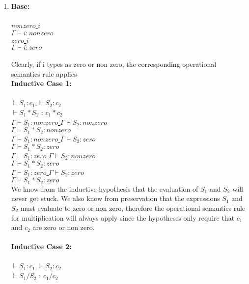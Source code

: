 \documentclass[11pt]{article}
\begin{document}
\begin{enumerate}
\begin{enumerate}
		
\item \textbf{Base:}\\
		\\
			\underline{$non zero$ $i$}\\
			$\Gamma\vdash i:non zero$\\
			
			\underline{$zero$ $i$}\\
			$\Gamma\vdash i:zero$\\
			\\
			
			Clearly, if i types as zero or non zero, the corresponding operational
semantics rule applies\\
			\textbf{Inductive Case 1:}\\
			\\
			\underline{$\vdash S_1:c_1$ \hspace{12} $\vdash S_2:c_2$}\\
			$\vdash S_1*S_2$ : $c_1*c_2$\\
			
			\underline{$\Gamma\vdash S_1:non zero$ \hspace{12} $\Gamma\vdash S_2:non zero$}\\
			$\Gamma\vdash S_1*S_2:non zero$\\
		
			\underline{$\Gamma\vdash S_1:non zero$ \hspace{12} $\Gamma\vdash S_2:zero$}\\
			$\Gamma\vdash S_1*S_2:zero$\\
		
			\underline{$\Gamma\vdash S_1:zero$ \hspace{12} $\Gamma\vdash S_2:non zero$}\\
			$\Gamma\vdash S_1*S_2:zero$\\
		
			\underline{$\Gamma\vdash S_1:zero$ \hspace{12} $\Gamma\vdash S_2:zero$}\\
			$\Gamma\vdash S_1*S_2:zero$\\
			
			We know from the inductive hypothesis that the evaluation of
$S_1$ and $S_2$ will never get stuck. We also know from
preservation that the expressions $S_1$ and $S_2$ must evaluate to
zero or non zero, therefore the operational
semantics rule for multiplication will always apply since the hypotheses
only require that $c_1$ and $c_2$ are zero or non zero.\\
			\\
			\textbf{Inductive Case 2:}\\
			\\
			\underline{$\vdash S_1:c_1$ \hspace{12} $\vdash S_2:c_2$}\\
			$\vdash S_1/S_2$ : $c_1/c_2$\\
			

\end{enumerate}
\end{enumerate}
\end{document}
